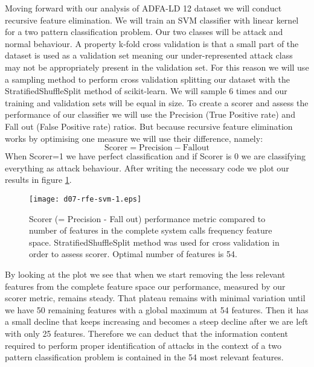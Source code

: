 \documentclass[reqno,openany,12pt]{amsbook}
\newcommand{\beqq}{\begin{equation*}}
\newcommand{\eeqq}{\end{equation*}}
\begin{document}
Moving forward with our analysis of ADFA-LD 12 dataset we will conduct recursive feature elimination. We will train an SVM classifier with linear kernel for a two pattern classification problem. Our two classes will be attack and normal behaviour. A property k-fold cross validation is that a small part of the dataset is used as a validation set meaning our under-represented attack class may not be appropriately present in the validation set. For this reason we will use a sampling method to perform cross validation splitting our dataset with the StratifiedShuffleSplit method of scikit-learn\cite{skl}. We will sample 6 times and our training and validation sets will be equal in size. To create a scorer and assess the performance of our classifier we will use the Precision (True Positive rate) and Fall out (False Positive rate) ratios. But because recursive feature elimination works by optimising one measure we will use their difference, namely:
\beqq
\mathrm{Scorer = Precision - Fall out}
\eeqq
When Scorer=1 we have perfect classification and if Scorer is 0 we are classifying everything as attack behaviour. After writing the necessary code we plot our results in figure \ref{svm-fr3}.

\begin{figure}[th]
\texttt{[image: d07-rfe-svm-1.eps]}
\caption{Scorer (= Precision - Fall out) performance metric compared to number of features in the complete system calls frequency feature space. StratifiedShuffleSplit method was used for cross validation in order to assess scorer. Optimal number of features is 54.}
\label{svm-fr3}
\end{figure}

By looking at the plot we see that when we start removing the less relevant features from the complete feature space our performance, measured by our scorer metric, remains steady. That plateau remains with minimal variation until we have 50 remaining features with a global maximum at 54 features. Then it has a small decline that keeps increasing and becomes a steep decline after we are left with only 25 features. Therefore we can deduct that the information content required to perform proper identification of attacks in the context of a two pattern classification problem is contained in the 54 most relevant features.


\end{document}
